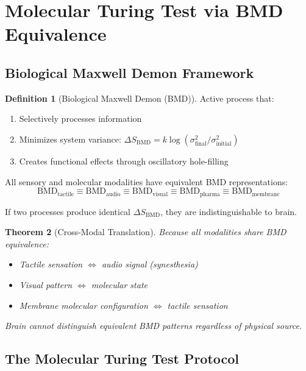 \documentclass[11pt,a4paper]{article}
\newtheorem{theorem}{Theorem}[section]
\theoremstyle{definition}
\newtheorem{definition}[theorem]{Definition}
\theoremstyle{remark}
\begin{document}
\section{Molecular Turing Test via BMD Equivalence}

\subsection{Biological Maxwell Demon Framework}

\begin{definition}[Biological Maxwell Demon (BMD)]
Active process that:
\begin{enumerate}
\item Selectively processes information
\item Minimizes system variance: $\Delta S_{\text{BMD}} = k \log(\sigma^2_{\text{final}}/\sigma^2_{\text{initial}})$
\item Creates functional effects through oscillatory hole-filling
\end{enumerate}
\end{definition}

\begin{axiom}
All sensory and molecular modalities have equivalent BMD representations:
\begin{equation}
\text{BMD}_{\text{tactile}} \equiv \text{BMD}_{\text{audio}} \equiv \text{BMD}_{\text{visual}} \equiv \text{BMD}_{\text{pharma}} \equiv \text{BMD}_{\text{membrane}}
\end{equation}

If two processes produce identical $\Delta S_{\text{BMD}}$, they are indistinguishable to brain.
\end{axiom}

\begin{theorem}[Cross-Modal Translation]
Because all modalities share BMD equivalence:
\begin{itemize}
\item Tactile sensation $\Leftrightarrow$ audio signal (synesthesia)
\item Visual pattern $\Leftrightarrow$ molecular state
\item Membrane molecular configuration $\Leftrightarrow$ tactile sensation
\end{itemize}

Brain cannot distinguish equivalent BMD patterns regardless of physical source.
\end{theorem}

\subsection{The Molecular Turing Test Protocol}
\end{document}

